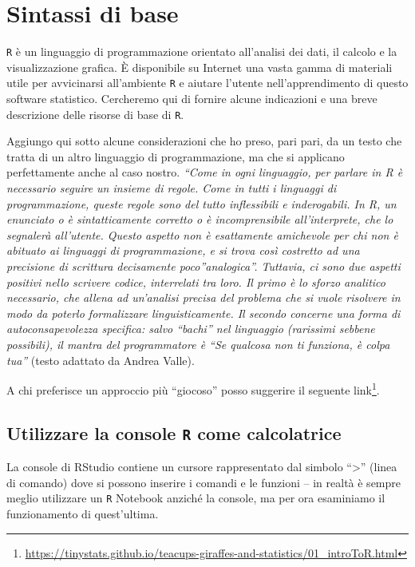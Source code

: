 \documentclass[
  11pt,
]{krantz}
\renewcommand{\href}[2]{#2\footnote{\url{#1}}}
\theoremstyle{definition}
\theoremstyle{definition}
\theoremstyle{definition}
\theoremstyle{definition}
\theoremstyle{remark}
\begin{document}
\hypertarget{chapter-sintassi}{%
\section{Sintassi di base}\label{chapter-sintassi}}

\texttt{R} è un linguaggio di programmazione orientato all'analisi dei dati, il calcolo e la visualizzazione grafica. È disponibile su Internet una vasta gamma di materiali utile per avvicinarsi all'ambiente \texttt{R} e aiutare l'utente nell'apprendimento di questo software statistico. Cercheremo qui di fornire alcune indicazioni e una breve descrizione delle risorse di base di \texttt{R}.

Aggiungo qui sotto alcune considerazioni che ho preso, pari pari, da un testo che tratta di un altro linguaggio di programmazione, ma che si applicano perfettamente anche al caso nostro. \emph{``Come in ogni linguaggio, per parlare in R è necessario seguire un insieme di regole. Come in tutti i linguaggi di programmazione, queste regole sono del tutto inflessibili e inderogabili. In R, un enunciato o è sintatticamente corretto o è incomprensibile all'interprete, che lo segnalerà all'utente. Questo aspetto non è esattamente amichevole per chi non è abituato ai linguaggi di programmazione, e si trova così costretto ad una precisione di scrittura decisamente poco''analogica''. Tuttavia, ci sono due aspetti positivi nello scrivere codice, interrelati tra loro. Il primo è lo sforzo analitico necessario, che allena ad un'analisi precisa del problema che si vuole risolvere in modo da poterlo formalizzare linguisticamente. Il secondo concerne una forma di autoconsapevolezza specifica: salvo ``bachi'' nel linguaggio (rarissimi sebbene possibili), il mantra del programmatore è ``Se qualcosa non ti funziona, è colpa tua''} (testo adattato da Andrea Valle).

A chi preferisce un approccio più ``giocoso'' posso suggerire il seguente \href{https://tinystats.github.io/teacups-giraffes-and-statistics/01_introToR.html}{link}.

\hypertarget{utilizzare-la-console-r-come-calcolatrice}{%
\subsection{\texorpdfstring{Utilizzare la console \texttt{R} come calcolatrice}{Utilizzare la console R come calcolatrice}}\label{utilizzare-la-console-r-come-calcolatrice}}

La console di RStudio contiene un cursore rappresentato dal simbolo ``\textgreater{}'' (linea di comando) dove si possono inserire i comandi e le funzioni -- in realtà è sempre meglio utilizzare un \texttt{R} Notebook anziché la console, ma per ora esaminiamo il funzionamento di quest'ultima.
\end{document}
